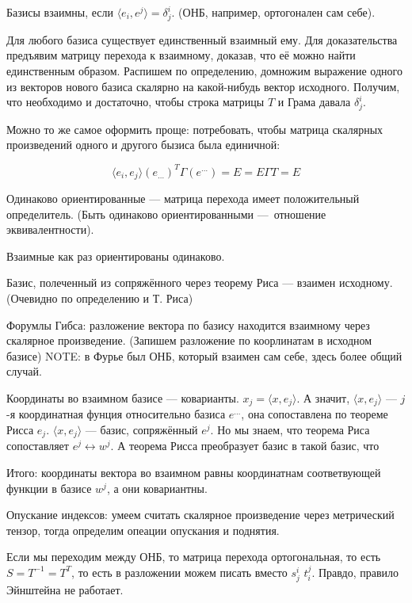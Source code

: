 \documentclass[12pt, a4paper]{article}
\begin{document}
Базисы взаимны, если $\langle e_i, e^j \rangle = \delta^i_j$.
(ОНБ, например, ортогонален сам себе).

Для любого базиса существует единственный взаимный ему. 
Для доказательства предъявим матрицу перехода к взаимному, доказав, что её можно найти единственным образом.
Распишем по определению, домножим выражение одного из векторов нового базиса скалярно на какой-нибудь вектор исходного.
Получим, что необходимо и достаточно, чтобы строка матрицы $T$ и Грама давала $\delta^i_j$.

Можно то же самое оформить проще: потребовать, чтобы матрица скалярных произведений одного и другого бызиса была единичной:

\begin{equation}
    \langle e_i, e_j \rangle (e_{…})^T \Gamma (e^{…}) = E = E \Gamma T = E
\end{equation}

Одинаково ориентированные — матрица перехода имеет положительный определитель. (Быть одинаково ориентированными — отношение эквивалентности).

Взаимные как раз ориентированы одинаково.

Базис, полеченный из сопряжённого через теорему Риса — взаимен исходному. (Очевидно по определению и Т. Риса)

Форумлы Гибса: разложение вектора по базису находится взаимному через скалярное произведение. (Запишем разложение по коорлинатам в исходном базисе)
NOTE: в Фурье был ОНБ, который взаимен сам себе, здесь более общий случай.

Координаты во взаимном базисе — коварианты. 
$x_j = \langle x, e_j \rangle$. А значит, $\langle x, e_j \rangle$ — $j$-я координатная фунция относительно базиса $e^{…}$, она сопоставлена по теореме Рисса $e_j$.
$\langle x, e_j \rangle$ — базис, сопряжённый $e^j$. 
Но мы знаем, что теорема Риса сопоставляет $e^j \leftrightarrow w^j$. 
А теорема Рисса преобразует базис в такой базис, что 

Итого: координаты вектора во взаимном равны координатнам соответвующей функции в базисе $w^j$, а они ковариантны.

Опускание индексов: умеем считать скалярное произведение через метрический тензор, тогда определим опеации опускания и поднятия.

Если мы переходим между ОНБ, то матрица перехода ортогональная, то есть $S = T^{-1} = T^T$, то есть в разложении можем писать вместо $s^i_j$ $t^j_i$. Правдо, правило Эйнштейна не работает.
\end{document}
